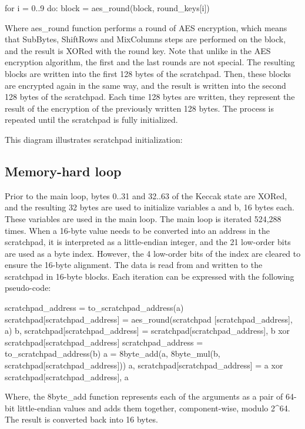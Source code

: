 \documentclass{article}
\begin{document}
      for i = 0..9 do:
          block = aes_round(block, round_keys[i])

   Where aes_round function performs a round of AES encryption, which
   means that SubBytes, ShiftRows and MixColumns steps are performed on
   the block, and the result is XORed with the round key. Note that
   unlike in the AES encryption algorithm, the first and the last rounds
   are not special. The resulting blocks are written into the first 128
   bytes of the scratchpad. Then, these blocks are encrypted again in
   the same way, and the result is written into the second 128 bytes of
   the scratchpad. Each time 128 bytes are written, they represent the
   result of the encryption of the previously written 128 bytes. The
   process is repeated until the scratchpad is fully initialized.

   This diagram illustrates scratchpad initialization:

 \subsection{Memory-hard loop}
   Prior to the main loop, bytes 0..31 and 32..63 of the Keccak state
   are XORed, and the resulting 32 bytes are used to initialize
   variables a and b, 16 bytes each. These variables are used in the
   main loop. The main loop is iterated 524,288 times. When a 16-byte
   value needs to be converted into an address in the scratchpad, it is
   interpreted as a little-endian integer, and the 21 low-order bits are
   used as a byte index. However, the 4 low-order bits of the index are
   cleared to ensure the 16-byte alignment. The data is read from and
   written to the scratchpad in 16-byte blocks. Each iteration can be
   expressed with the following pseudo-code:

      scratchpad_address = to_scratchpad_address(a)
      scratchpad[scratchpad_address] = aes_round(scratchpad 
        [scratchpad_address], a)
      b, scratchpad[scratchpad_address] = scratchpad[scratchpad_address],
        b xor scratchpad[scratchpad_address]
      scratchpad_address = to_scratchpad_address(b)
      a = 8byte_add(a, 8byte_mul(b, scratchpad[scratchpad_address]))
      a, scratchpad[scratchpad_address] = a xor 
        scratchpad[scratchpad_address], a

   Where, the 8byte_add function represents each of the arguments as a
   pair of 64-bit little-endian values and adds them together,
   component-wise, modulo 2^64. The result is converted back into 16
   bytes.
\end{document}
